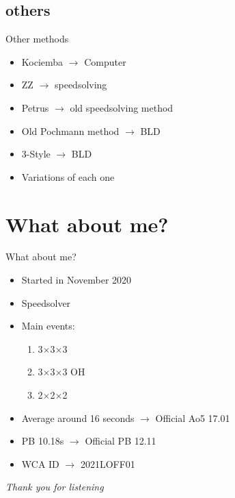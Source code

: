 \documentclass{beamer}
\begin{document}
        \subsection{others}
            \begin{frame}{Other methods}
                \begin{itemize}
                    \item Kociemba $\rightarrow{}$ Computer \pause{}
                    \item ZZ $\rightarrow{}$ speedsolving \pause{}
                    \item Petrus $\rightarrow{}$ old speedsolving method \pause{}
                    \item Old Pochmann method $\rightarrow{}$ BLD \pause{}
                    \item 3-Style $\rightarrow{}$ BLD \pause{}
                    \item Variations of each one 
                \end{itemize}
            \end{frame}
    \section{What about me?}
        \begin{frame}{What about me?}
            \begin{itemize}
                \item Started in November 2020 \pause{}
                \item Speedsolver \pause{}
                \item Main events: \pause{}
                \begin{enumerate}
                    \item 3$\times$3$\times$3 \pause{}
                    \item 3$\times$3$\times$3 OH \pause{}
                    \item 2$\times$2$\times$2 \pause{}
                \end{enumerate}
                \item Average around 16 seconds $\rightarrow$ Official Ao5 17.01 \pause{}
                \item PB 10.18s $\rightarrow$ Official PB 12.11\pause{}
                \item WCA ID $\rightarrow$ 2021LOFF01
            \end{itemize}
        \end{frame}
    \begin{frame}{}
        \centering \Large
        \emph{Thank you for listening}
        \end{frame}
\end{document}
